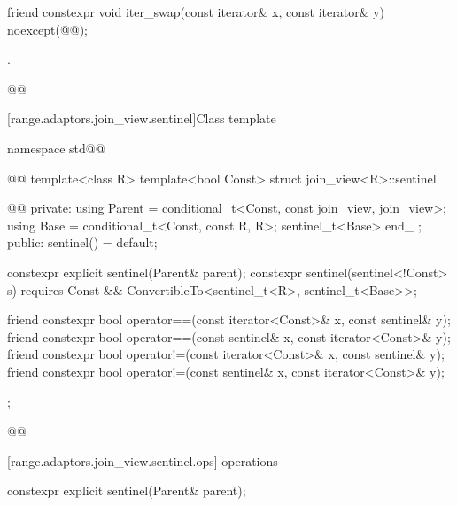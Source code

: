 \begin{itemdecl}
friend constexpr void iter_swap(const iterator& x, const iterator& y)
  noexcept(@\oldtxt{\seebelow}@);
\end{itemdecl}

\begin{itemdescr}
\pnum
\returns {}.

\pnum
{}
\begin{codeblock}
@@
\end{codeblock}
\end{itemdescr}

[range.adaptors.join_view.sentinel]{Class template }

\pnum
{}

\begin{codeblock}
namespace std@@ { @@
  template<class R>
  template<bool Const>
  struct join_view<R>::sentinel { @\newtxt{// \expos}@
  private:
    using Parent = conditional_t<Const, const join_view, join_view>;
    using Base   = conditional_t<Const, const R, R>;
    sentinel_t<Base> end_ {};
  public:
    sentinel() = default;

    constexpr explicit sentinel(Parent& parent);
    constexpr sentinel(sentinel<!Const> s) requires Const &&
        ConvertibleTo<sentinel_t<R>, sentinel_t<Base>>;

    friend constexpr bool operator==(const iterator<Const>& x, const sentinel& y);
    friend constexpr bool operator==(const sentinel& x, const iterator<Const>& y);
    friend constexpr bool operator!=(const iterator<Const>& x, const sentinel& y);
    friend constexpr bool operator!=(const sentinel& x, const iterator<Const>& y);
  };
}@\oldtxt{\}}@
\end{codeblock}

[range.adaptors.join_view.sentinel.ops]{ operations}

\begin{itemdecl}
constexpr explicit sentinel(Parent& parent);
\end{itemdecl}

